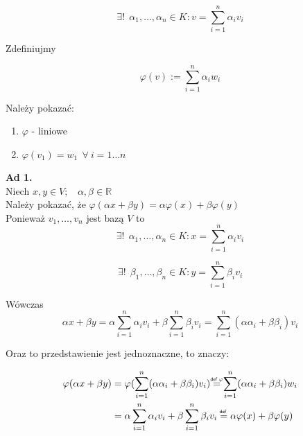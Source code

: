 \documentclass[a5paper,8pt]{article}
\newcommand\defeq[1]{\mathrel{\overset{\makebox[0pt]{\mbox{\normalfont\tiny\sffamily def~{#1}}}}{=}}}
\begin{document}
    \begin{equation*}
        \exists ! ~~ \alpha_1, \ldots, \alpha_n \in K:
        v = \sum_{i = 1}^{n} \alpha_i v_i
    \end{equation*}

    Zdefiniujmy

    \begin{equation*}
        \varphi(v) := \sum_{i = 1}^{n} \alpha_i w_i
    \end{equation*}

    Należy pokazać:
    \begin{enumerate}
        \item
            $ \varphi $ - liniowe
        \item $\varphi(v_1) = w_1 ~~ \forall ~ i = 1 \ldots n $
    \end{enumerate}

    \large{\textbf{Ad 1.}} \\
    Niech $ x, y \in V; ~~~~\alpha, \beta \in \mathbb{R} $ \\
    Należy pokazać, że $ \varphi( \alpha x + \beta y ) =
    \alpha \varphi(x) + \beta \varphi(y) $ \\

    Ponieważ $ v_1, \ldots, v_n $ jest bazą $ V $ to
    \begin{equation*}
        \exists ! ~~ \alpha_1, \ldots, \alpha_n \in K:
        x = \sum_{i = 1}^{n} \alpha_i v_i
    \end{equation*}

    \begin{equation*}
        \exists ! ~~ \beta_1, \ldots, \beta_n \in K:
        y = \sum_{i = 1}^{n} \beta_i v_i
    \end{equation*}

    Wówczas
    \begin{equation*}
        \alpha x + \beta y = \alpha \sum_{i = 1}^{n} \alpha_i v_i
        + \beta \sum_{i = 1}^{n} \beta_i v_i
        = \sum_{i = 1}^{n} ( \alpha \alpha_i + \beta \beta_i )v_i
    \end{equation*}

    Oraz to przedstawienie jest jednoznaczne, to znaczy:

    \begin{equation*}
        \begin{aligned}
            \varphi( \alpha x + \beta y ) & = \varphi (  \sum_{i = 1}^{n} ( \alpha \alpha_i + \beta \beta_i )v_i )
            \defeq{$\varphi$} \sum_{i = 1}^{n} ( \alpha \alpha_i + \beta \beta_i )w_i\\
            & = \alpha \sum_{i = 1}^{n} \alpha_i v_i + \beta \sum_{i = 1}^{n} \beta_i v_i
            \defeq{} \alpha \varphi(x) + \beta \varphi(y)
        \end{aligned}
    \end{equation*}
\end{document}
